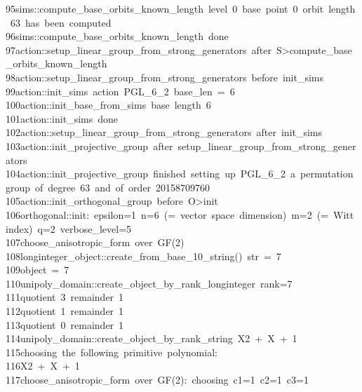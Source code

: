 \begin{tabbing}
95\>sims::compute\_base\_orbits\_known\_length\ level\ 0\ base\ point\ 0\ orbit\ length\ 63\ has\ been\ computed\\[0pt]
96\>sims::compute\_base\_orbits\_known\_length\ done\\[0pt]
97\>action::setup\_linear\_group\_from\_strong\_generators\ after\ S>compute\_base\_orbits\_known\_length\\[0pt]
98\>action::setup\_linear\_group\_from\_strong\_generators\ before\ init\_sims\\[0pt]
99\>action::init\_sims\ action\ PGL\_6\_2\ base\_len\ =\ 6\\[0pt]
100\>action::init\_base\_from\_sims\ base\ length\ 6\\[0pt]
101\>action::init\_sims\ done\\[0pt]
102\>action::setup\_linear\_group\_from\_strong\_generators\ after\ init\_sims\\[0pt]
103\>action::init\_projective\_group\ after\ setup\_linear\_group\_from\_strong\_generators\\[0pt]
104\>action::init\_projective\_group\ finished\ setting\ up\ PGL\_6\_2\ a\ permutation\ group\ of\ degree\ 63\ and\ of\ order\ 20158709760\\[0pt]
105\>action::init\_orthogonal\_group\ before\ O>init\\[0pt]
106\>orthogonal::init:\ epsilon=1\ n=6\ (=\ vector\ space\ dimension)\ m=2\ (=\ Witt\ index)\ q=2\ verbose\_level=5\\[0pt]
107\>choose\_anisotropic\_form\ over\ GF(2)\\[0pt]
108\>longinteger\_object::create\_from\_base\_10\_string()\ str\ =\ 7\\[0pt]
109\>object\ =\ 7\\[0pt]
110\>unipoly\_domain::create\_object\_by\_rank\_longinteger\ rank=7\\[0pt]
111\>quotient\ 3\ remainder\ 1\\[0pt]
112\>quotient\ 1\ remainder\ 1\\[0pt]
113\>quotient\ 0\ remainder\ 1\\[0pt]
114\>unipoly\_domain::create\_object\_by\_rank\_string\ X2\ +\ X\ +\ 1\\[0pt]
115\>choosing\ the\ following\ primitive\ polynomial:\\[0pt]
116\>X2\ +\ X\ +\ 1\\[0pt]
117\>choose\_anisotropic\_form\ over\ GF(2):\ choosing\ c1=1\ c2=1\ c3=1\\[0pt]

\end{tabbing}
